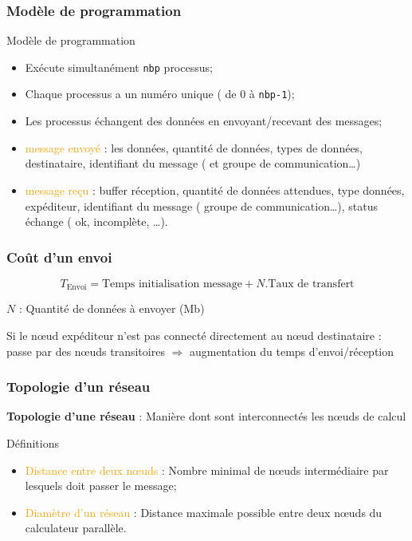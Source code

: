 \documentclass[handout]{beamer}
\begin{document}
\begin{frame}[fragile]
\frametitle{Modèle de programmation}

\begin{block}{Modèle de programmation}
\begin{itemize}
\item Exécute simultanément \texttt{nbp} processus;
\item Chaque processus a un numéro unique ( de 0 à \texttt{nbp-1});
\item Les processus échangent des données en envoyant/recevant des messages;
\item \textcolor{orange}{message envoyé} : les données, quantité de données, types de données, destinataire,
identifiant du message ( et groupe de communication\ldots )
\item \textcolor{orange}{message reçu} : buffer réception, quantité de données attendues, type données,
expéditeur, identifiant du message ( groupe de communication\ldots), status échange ( ok, incomplète, \ldots ).
\end{itemize}
\end{block}
\end{frame}

\begin{frame}[fragile]
\frametitle{Coût d'un envoi}

\[
  T_{\mbox{Envoi}} = \mbox{Temps initialisation message} + N.\mbox{Taux de transfert}
\]

$N$ : Quantité de données à envoyer (Mb)

Si le n{\oe}ud expéditeur n'est pas connecté directement au n{\oe}ud destinataire :
passe par des n{\oe}uds transitoires $\Rightarrow$ augmentation du temps d'envoi/réception
\end{frame}

\begin{frame}[fragile]
\frametitle{Topologie d'un réseau}

\textbf{Topologie d'une réseau} : Manière dont sont interconnectés les n{\oe}uds de calcul

\begin{block}{Définitions}
\begin{itemize}
\item \textcolor{orange}{Distance entre deux n{\oe}uds} : Nombre minimal de n{\oe}uds intermédiaire
par lesquels doit passer le message;
\item \textcolor{orange}{Diamètre d'un réseau} : Distance maximale possible entre deux n{\oe}uds
du calculateur parallèle.
\end{itemize}
\end{block}
\end{frame}
\end{document}
